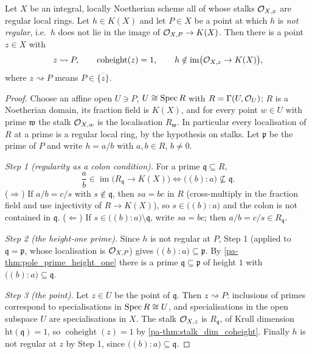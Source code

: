 \begin{theorem}
  \label{pa-thm:pole_purity}
  \leanok

  Let \(X\) be an integral, locally Noetherian scheme all of whose stalks
  \(\mathcal{O}_{X,x}\) are regular local rings. Let \(h \in K(X)\) and let
  \(P \in X\) be a point at which \(h\) is \emph{not regular}, i.e.\ \(h\) does
  not lie in the image of \(\mathcal{O}_{X,P} \to K(X)\). Then there is a point
  \(z \in X\) with
  \[
    z \rightsquigarrow P, \qquad
    \operatorname{coheight}(z) = 1, \qquad
    h \notin \operatorname{im}\bigl(\mathcal{O}_{X,z} \to K(X)\bigr),
  \]
  where \(z \rightsquigarrow P\) means \(P \in \overline{\{z\}}\).
\end{theorem}
\begin{proof}
  \leanok
  Choose an affine open \(U \ni P\), \(U \cong \operatorname{Spec} R\) with
  \(R = \Gamma(U, \mathcal{O}_{U})\); \(R\) is a Noetherian domain, its fraction field
  is \(K(X)\), and for every point \(w \in U\) with prime \(\mathfrak w\) the
  stalk \(\mathcal{O}_{X,w}\) is the localisation \(R_{\mathfrak w}\). In particular
  every localisation of \(R\) at a prime is a regular local ring, by the
  hypothesis on stalks. Let \(\mathfrak p\) be the prime of \(P\) and write
  \(h = a/b\) with \(a, b \in R\), \(b \neq 0\).

  \emph{Step 1 (regularity as a colon condition).} For a prime
  \(\mathfrak q \subseteq R\),
  \[
    \frac{a}{b} \in \operatorname{im}\bigl(R_{\mathfrak q} \to K(X)\bigr)
    \iff
    \bigl((b) : a\bigr) \not\subseteq \mathfrak q .
  \]
  (\(\Rightarrow\)) If \(a/b = c/s\) with \(s \notin \mathfrak q\), then
  \(s a = b c\) in \(R\) (cross-multiply in the fraction field and use
  injectivity of \(R \to K(X)\)), so \(s \in \bigl((b) : a\bigr)\) and the colon
  is not contained in \(\mathfrak q\). (\(\Leftarrow\)) If
  \(s \in \bigl((b) : a\bigr) \setminus \mathfrak q\), write \(s a = b c\); then
  \(a/b = c/s \in R_{\mathfrak q}\).

  \emph{Step 2 (the height-one prime).} Since \(h\) is not regular at \(P\),
  Step 1 (applied to \(\mathfrak q = \mathfrak p\), whose localisation is
  \(\mathcal{O}_{X,P}\)) gives \(\bigl((b) : a\bigr) \subseteq \mathfrak p\). By
  \ref{pa-thm:pole_prime_height_one} there is a prime
  \(\mathfrak q \subseteq \mathfrak p\) of height \(1\) with
  \(\bigl((b) : a\bigr) \subseteq \mathfrak q\).

  \emph{Step 3 (the point).} Let \(z \in U\) be the point of \(\mathfrak q\).
  Then \(z \rightsquigarrow P\): inclusions of primes correspond to
  specialisations in \(\operatorname{Spec} R \cong U\), and specialisations in the open
  subspace \(U\) are specialisations in \(X\). The stalk \(\mathcal{O}_{X,z}\) is
  \(R_{\mathfrak q}\), of Krull dimension \(\mathrm{ht}(\mathfrak q) = 1\), so
  \(\operatorname{coheight}(z) = 1\) by \ref{pa-thm:stalk_dim_coheight}. Finally
  \(h\) is not regular at \(z\) by Step 1, since
  \(\bigl((b) : a\bigr) \subseteq \mathfrak q\).
\end{proof}

